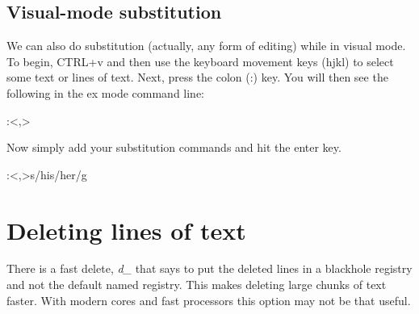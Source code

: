 \subsection{Visual-mode substitution}

We can also do substitution (actually, any form of editing) while in visual mode. To begin, CTRL+v and then use the keyboard movement keys (hjkl) to select some text or lines of text. Next, press the colon (:) key. You will then see the following in the ex mode command line:

:\textquotesingle<,\textquotesingle>

Now simply add your substitution commands and hit the enter key.

:\textquotesingle<,\textquotesingle>s/his/her/g

\section{Deleting lines of text}
 There is a fast delete, \emph{d\_} that says to put the deleted lines in a blackhole registry and not the default named registry. This makes deleting large chunks of text faster. With modern cores and fast processors this option may not be that useful.

